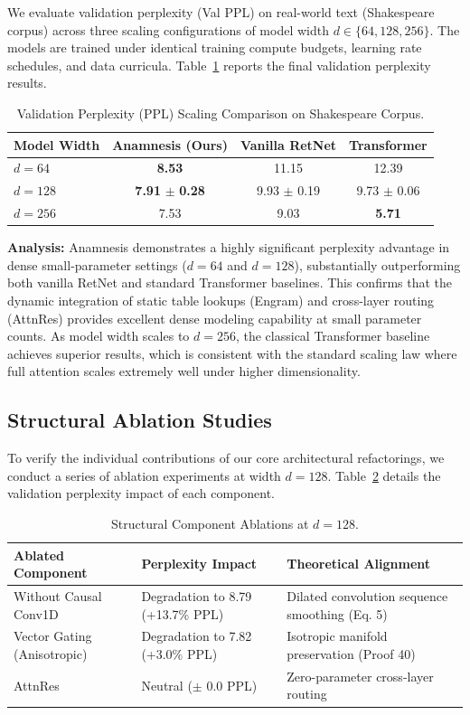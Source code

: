 \documentclass[11pt]{article}
\begin{document}
We evaluate validation perplexity (Val PPL) on real-world text (Shakespeare corpus) across three scaling configurations of model width $d \in \{64, 128, 256\}$. The models are trained under identical training compute budgets, learning rate schedules, and data curricula. Table~\ref{tab:scaling} reports the final validation perplexity results.

\begin{table}[H]
\centering
\caption{Validation Perplexity (PPL) Scaling Comparison on Shakespeare Corpus.}
\label{tab:scaling}
\begin{tabular}{lccc}
\toprule
Model Width & Anamnesis (Ours) & Vanilla RetNet & Transformer \\
\midrule
$d = 64$ & \textbf{8.53} & 11.15 & 12.39 \\
$d = 128$ & \textbf{7.91} $\pm$ \textbf{0.28} & 9.93 $\pm$ 0.19 & 9.73 $\pm$ 0.06 \\
$d = 256$ & 7.53 & 9.03 & \textbf{5.71} \\
\bottomrule
\end{tabular}
\end{table}

\textbf{Analysis:} Anamnesis demonstrates a highly significant perplexity advantage in dense small-parameter settings ($d=64$ and $d=128$), substantially outperforming both vanilla RetNet and standard Transformer baselines. This confirms that the dynamic integration of static table lookups (Engram) and cross-layer routing (AttnRes) provides excellent dense modeling capability at small parameter counts. As model width scales to $d=256$, the classical Transformer baseline achieves superior results, which is consistent with the standard scaling law where full attention scales extremely well under higher dimensionality.

\subsection{Structural Ablation Studies}

To verify the individual contributions of our core architectural refactorings, we conduct a series of ablation experiments at width $d = 128$. Table~\ref{tab:ablations} details the validation perplexity impact of each component.

\begin{table}[H]
\centering
\caption{Structural Component Ablations at $d = 128$.}
\label{tab:ablations}
\begin{tabular}{lll}
\toprule
Ablated Component & Perplexity Impact & Theoretical Alignment \\
\midrule
Without Causal Conv1D & Degradation to 8.79 (+13.7\% PPL) & Dilated convolution sequence smoothing (Eq. 5) \\
Vector Gating (Anisotropic) & Degradation to 7.82 (+3.0\% PPL) & Isotropic manifold preservation (Proof 40) \\
AttnRes & Neutral ($\pm$ 0.0 PPL) & Zero-parameter cross-layer routing \\
\bottomrule
\end{tabular}
\end{table}
\end{document}
